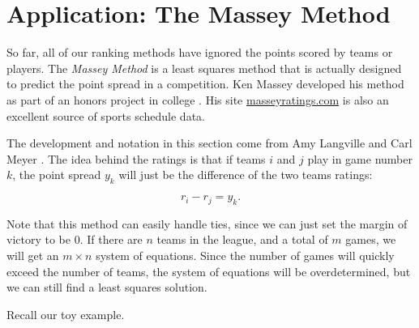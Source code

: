 \documentclass[
]{book}
\theoremstyle{definition}
\theoremstyle{definition}
\theoremstyle{definition}
\theoremstyle{definition}
\theoremstyle{remark}
\begin{document}
\section{Application: The Massey Method}\label{application-the-massey-method}

So far, all of our ranking methods have ignored the points scored by teams or players. The \emph{Massey Method} is a least squares method that is actually designed to predict the point spread in a competition. Ken Massey developed his method as part of an honors project in college \autocite{Massey}. His site \href{http://masseyratings.com}{masseyratings.com} is also an excellent source of sports schedule data.

The development and notation in this section come from Amy Langville and Carl Meyer \autocite{No1}. The idea behind the ratings is that if teams \(i\) and \(j\) play in game number \(k\), the point spread \(y_k\) will just be the difference of the two teams ratings:

\[r_i-r_j=y_k.\]

Note that this method can easily handle ties, since we can just set the margin of victory to be 0. If there are \(n\) teams in the league, and a total of \(m\) games, we will get an \(m\times n\) system of equations. Since the number of games will quickly exceed the number of teams, the system of equations will be overdetermined, but we can still find a least squares solution.

Recall our toy example.
\end{document}
